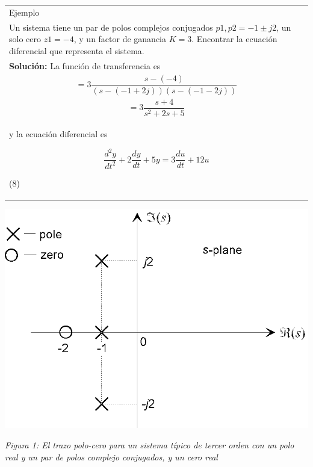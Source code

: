 \documentclass[10pt,a4paper]{article}
\begin{document}
\begin{center}
  \begin{tabular}{p{16cm}}
    \hline
    Ejemplo\\
    Un sistema tiene un par de polos complejos conjugados $p{\scriptscriptstyle 1},p{\scriptscriptstyle 2} = -1 \pm j2$, un solo cero $z{\scriptscriptstyle 1}=-4$, y un factor de ganancia $K=3$. Encontrar la ecuación diferencial que representa el sistema.\\
    \textbf{Solución:} La función de transferencia es
    \begin{center}
      \[H(s)=K\frac{s-z}{(s-p{\scriptscriptstyle 1})(s-p{\scriptscriptstyle 2})}\]\\
      \[=3\frac{s-(-4)}{(s-(-1 + 2j))(s-(-1 - 2j))}\]\\
      \[=3\frac{s+4}{s^{2}+2s+5}\]
    \end{center}
    \begin{minipage}{0.9\textwidth}
      \begin{flushright}
          (7)
      \end{flushright}
    \end{minipage}
    \\y la ecuación diferencial es
    \begin{center}
      \[\frac{d^{2}y}{dt^{2}}+2\frac{dy}{dt}+5y=3\frac{du}{dt}+12u\]
    \end{center}
    \begin{minipage}{0.9\textwidth}
      \begin{flushright}
          (8)
      \end{flushright}
    \end{minipage}
    \\
    \hline
  \end{tabular}
\end{center}
\clearpage
\begin{center}
  \includegraphics[scale=0.25]{img/poleAndZeros1.png}
\end{center}
\textit{Figura 1: El trazo polo-cero  para un sistema típico de tercer orden con un polo real y un par de polos complejo conjugados, y un cero real}
\end{document}

